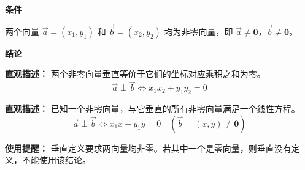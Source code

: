 \begin{statementbox}
	\textbf{\textcolor{CStatement}{条件}}
	\begin{description}[style=nextline, leftmargin=2.8em, labelsep=0.5em, itemsep=0.35em]
		\item[\textbf{\textcolor{CStatement}{条件 1（向量非零）：}}]
			两个向量 $\vec{a}=(x_1,y_1)$ 和 $\vec{b}=(x_2,y_2)$ 均为非零向量，即 $\vec{a}\neq\mathbf{0}$，$\vec{b}\neq\mathbf{0}$。
	\end{description}
	\textbf{\textcolor{CStatement}{结论}}
	\begin{description}[style=nextline, leftmargin=2.8em, labelsep=0.5em, itemsep=0.45em]
		\item[\textbf{\textcolor{CStatement}{结论一（坐标判垂直）：}}]
			\textbf{\textcolor{CStatement}{直观描述：}}
			两个非零向量垂直等价于它们的坐标对应乘积之和为零。
			\[
				\vec{a}\perp\vec{b} \iff x_1x_2+y_1y_2=0
			\]
		\item[\textbf{\textcolor{CStatement}{推广结论（求垂向量）：}}]
			\textbf{\textcolor{CStatement}{直观描述：}}
			已知一个非零向量，与它垂直的所有非零向量满足一个线性方程。
			\[
				\vec{a}\perp\vec{b} \iff x_1x+y_1y=0 \quad (\vec{b}=(x,y)\neq\mathbf{0})
			\]
	\end{description}
	\textbf{\textcolor{CStatement}{使用提醒：}}
	垂直定义要求两向量均非零。若其中一个是零向量，则垂直没有定义，不能使用该结论。
\end{statementbox}
